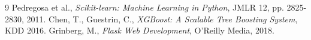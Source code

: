\documentclass[12pt,a4paper]{article}
\begin{document}
\begin{thebibliography}{9}
 Pedregosa et al., \emph{Scikit-learn: Machine Learning in Python}, JMLR 12, pp. 2825-2830, 2011.
 Chen, T., Guestrin, C., \emph{XGBoost: A Scalable Tree Boosting System}, KDD 2016.
 Grinberg, M., \emph{Flask Web Development}, O'Reilly Media, 2018.
\end{thebibliography}
\end{document}
